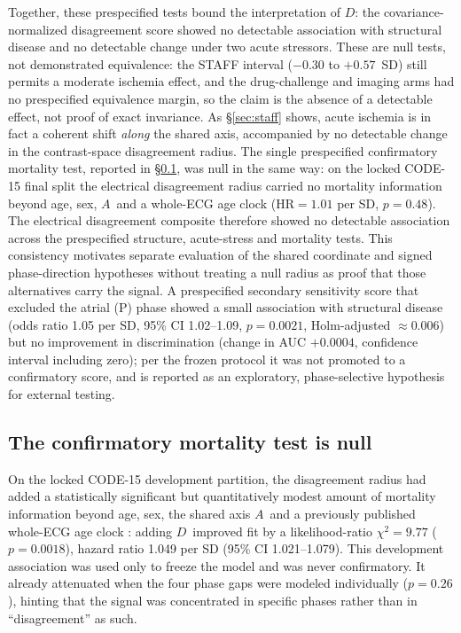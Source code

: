 \documentclass[11pt]{article}
\newcommand{\D}{\ensuremath{D}}
\newcommand{\A}{\ensuremath{A}}
\begin{document}
Together, these prespecified tests bound the interpretation of \D: the
covariance-normalized disagreement score showed no detectable association with
structural disease and no detectable change under two acute stressors. These
are null tests, not demonstrated equivalence: the
STAFF interval ($-\num{0.30}$ to $+\num{0.57}$~SD) still permits a moderate ischemia effect,
and the drug-challenge and imaging arms had no prespecified equivalence margin, so the claim
is the absence of a detectable effect, not proof of exact invariance. As
\S\ref{sec:staff} shows, acute ischemia is in fact a coherent shift \emph{along} the
shared axis, accompanied by no detectable change in the contrast-space disagreement radius.
The single prespecified confirmatory mortality test, reported in
\S\ref{sec:mortality}, was null in the same way: on the locked CODE-15 final split the
electrical disagreement radius carried no mortality information beyond age, sex, \A\
and a whole-ECG age clock ($\text{HR}=\num{1.01}$ per SD, $p=\num{0.48}$). The
electrical disagreement composite therefore showed no detectable association
across the prespecified structure, acute-stress and mortality tests. This
consistency motivates separate evaluation of the shared coordinate and signed
phase-direction hypotheses without treating a null radius as proof that those
alternatives carry the signal.
A prespecified secondary sensitivity score that excluded the atrial (P) phase showed
a small association with structural disease (odds ratio \num{1.05} per SD, 95\% CI
\numrange{1.02}{1.09}, $p=\num{0.0021}$, Holm-adjusted $\approx\num{0.006}$) but no
improvement in discrimination (change in AUC $+\num{0.0004}$, confidence interval
including zero); per the frozen protocol it was not promoted to a confirmatory
score, and is reported as an exploratory, phase-selective hypothesis for external
testing.

\subsection{The confirmatory mortality test is null}
\label{sec:mortality}

On the locked CODE-15 development partition, the disagreement radius had added a
statistically significant but quantitatively modest amount of mortality information
beyond age, sex, the shared axis \A\ and a previously published whole-ECG age clock
\citep{lima2021}: adding \D\ improved fit by a likelihood-ratio
$\chi^2=\num{9.77}$ ($p=\num{0.0018}$), hazard ratio \num{1.049} per SD
(95\% CI \numrange{1.021}{1.079}). This development association was used only to freeze
the model and was never confirmatory. It already attenuated when the four phase gaps were
modeled individually ($p=\num{0.26}$), hinting that the signal was concentrated in
specific phases rather than in ``disagreement'' as such.
\end{document}
